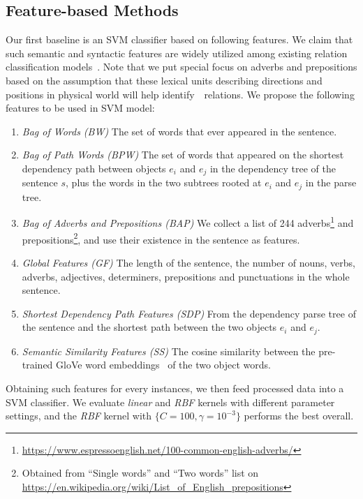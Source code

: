 \subsection{Feature-based Methods}
\label{sec:feature}
Our first baseline is an SVM classifier based on following features. 
We claim that such semantic and syntactic features are widely utilized among existing relation classification models~\cite{Bunescu2005ASP,sem,Zhou2005ExploringVK,Ren2017CoTypeJE}. Note that we put special focus on adverbs and prepositions based on the assumption that these lexical units describing directions and positions in physical world will help identify~\lnear~relations. We propose the following features to be used in SVM model:
\begin{enumerate}
\item \textit{Bag of Words (BW)}
The set of words that ever appeared in the sentence. 
\item \textit{Bag of Path Words (BPW)}
The set of words that appeared on
the shortest dependency path between objects $e_i$ and $e_j$ in the 
dependency tree of the sentence $s$, plus the words in the two subtrees 
rooted at $e_i$ and $e_j$ in the parse tree.
\item \textit{Bag of Adverbs and Prepositions (BAP)}
We collect a list of 244 adverbs\footnote{\url{https://www.espressoenglish.net/100-common-english-adverbs/}} and prepositions\footnote{Obtained from ``Single words'' and ``Two words'' list on \url{https://en.wikipedia.org/wiki/List_of_English_prepositions}}, and use their existence in the sentence as features. 
\item \textit{Global Features (GF)}
The length of the sentence, the number of nouns, verbs, adverbs, adjectives, determiners, prepositions and punctuations in the whole sentence. 
\item \textit{Shortest Dependency Path Features (SDP)}
From the dependency parse tree of the sentence and the shortest path 
between the two objects $e_i$ and $e_j$. 
\item \textit{Semantic Similarity Features (SS)}
The cosine similarity between the pre-trained GloVe word embeddings~\cite{pennington2014glove} of the two object words.
\end{enumerate}

Obtaining such features for every instances, 
we then feed processed data into a SVM classifier. 
We evaluate \textit{linear} and \textit{RBF} kernels with different parameter settings, and the \textit{RBF} kernel with $\{C=100, \gamma=10^{-3}\}$ performs the best overall.

